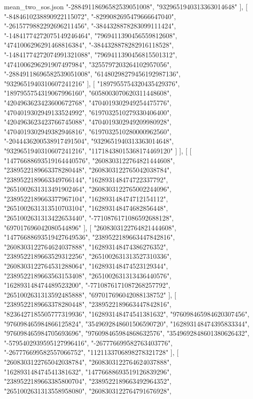 \begin{filecontents*}[overwrite]{mean_two_sos.json}
    "-28849118696582539051008",
    "9329651940313363014648"
   ],
   [
    "-8484610238890922115072",
    "-8299082695479666647040",
    "-2615779882292696211456",
    "-3844328878283099111424",
    "-14841774272075149246464",
    "7969411390456559812608",
    "4741006296291468816384",
    "-3844328878282916118528",
    "-14841774272074991321088",
    "7969411390456815501312",
    "4741006296291907497984",
    "3255797203264102957056",
    "-28849118696582539051008",
    "61480298279456192987136",
    "9329651940310607241216"
   ],
   [
    "1897955754320435429376",
    "1897955754319067996160",
    "6058003070620311448608",
    "4204963623423600672768",
    "4704019302949254475776",
    "4704019302949133524992",
    "6197032510279330406400",
    "4204963623423766745088",
    "4704019302949209980928",
    "4704019302949382946816",
    "6197032510280000962560",
    "-2044436200538917491504",
    "9329651940313363014648",
    "9329651940310607241216",
    "11718438015368174469120"
   ]
  ],
  [
   [
    "14776688693519164440576",
    "2608303122764821444608",
    "2389522189663378280448",
    "2608303122765042038784",
    "2389522189663349766144",
    "162893148474722337792",
    "2651002631313491902464",
    "2608303122765002244096",
    "2389522189663377967104",
    "162893148474712154112",
    "2651002631313510703104",
    "162893148474682856448",
    "2651002631313422653440",
    "-7710876171086592688128",
    "697017696042080544896"
   ],
   [
    "2608303122764821444608",
    "14776688693519427649536",
    "2389522189663447842816",
    "2608303122764624037888",
    "162893148474386276352",
    "2389522189663529312256",
    "2651002631313527310336",
    "2608303122764531288064",
    "162893148474523129344",
    "2389522189663563153408",
    "2651002631313436440576",
    "162893148474489523200",
    "-7710876171087268257792",
    "2651002631313592485888",
    "697017696042088138752"
   ],
   [
    "2389522189663378280448",
    "2389522189663447842816",
    "8236427185505777319936",
    "162893148474541381632",
    "976098465984620307456",
    "976098465984866125824",
    "3549692848601506590720",
    "162893148474395833344",
    "976098465984705693696",
    "976098465984868632576",
    "3549692848601380626432",
    "-5795402939595127996416",
    "-267776699582763403776",
    "-267776699582557066752",
    "1121133706898278321728"
   ],
   [
    "2608303122765042038784",
    "2608303122764624037888",
    "162893148474541381632",
    "14776688693519126839296",
    "2389522189663385800704",
    "2389522189663492964352",
    "2651002631313558958080",
    "2608303122764791676928",

\end{filecontents*}
